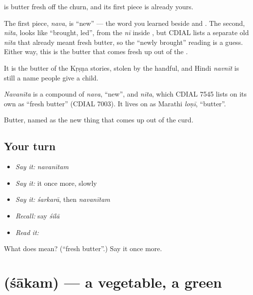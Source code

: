 \textbf{} is butter fresh off the churn, and its first piece is already yours.

The first piece, \emph{nava}, is \textquotedblleft{}new\textquotedblright{} — the word you learned beside  and . The second, \emph{nīta}, looks like \textquotedblleft{}brought, led\textquotedblright{}, from the \emph{nī} inside , but CDIAL lists a separate old \emph{nīta} that already meant fresh butter, so the \textquotedblleft{}newly brought\textquotedblright{} reading is a guess. Either way, this is the butter that comes fresh up out of the .

It is the butter of the Kṛṣṇa stories, stolen by the handful, and Hindi \emph{navnīt} is still a name people give a child.

\begin{cousinweb}
\emph{Navanīta} is a compound of \emph{nava}, \textquotedblleft{}new\textquotedblright{}, and \emph{nīta}, which CDIAL 7545 lists on its own as \textquotedblleft{}fresh butter\textquotedblright{} (CDIAL 7003). It lives on as Marathi \emph{loṇī}, \textquotedblleft{}butter\textquotedblright{}.
\end{cousinweb}

\begin{grammarlens}[title={What you've built}]
Butter, named as the new thing that comes up out of the curd.
\end{grammarlens}

\subsection*{Your turn}
\begin{itemize}
\raggedright
  \item \emph{Say it:} \emph{navanītam}
  \item \emph{Say it:} it once more, slowly
  \item \emph{Say it:} \emph{śarkarā}, then \emph{navanītam}
  \item \emph{Recall:} say \emph{śilā}
  \item \emph{Read it:} \textbf{}
\end{itemize}

\begin{tcolorbox}[breakable,colback=teal!4,colframe=teal!35!black,title={Before you move on}]
What does  mean? (\textquotedblleft{}fresh butter\textquotedblright{}.) Say it once more.
\end{tcolorbox}
\section[\texorpdfstring{\sk{शाकम्} (śākam)}{शाकम् (śākam)}]{ (śākam) — a vegetable, a green}

